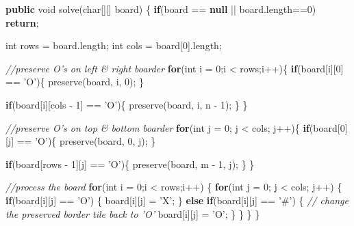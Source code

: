 \documentclass[]{book}
\newenvironment{Shaded}{\begin{snugshade}}{\end{snugshade}}
\newcommand{\CharTok}[1]{\textcolor[rgb]{0.31,0.60,0.02}{#1}}
\newcommand{\CommentTok}[1]{\textcolor[rgb]{0.56,0.35,0.01}{\textit{#1}}}
\newcommand{\DataTypeTok}[1]{\textcolor[rgb]{0.13,0.29,0.53}{#1}}
\newcommand{\DecValTok}[1]{\textcolor[rgb]{0.00,0.00,0.81}{#1}}
\newcommand{\FunctionTok}[1]{\textcolor[rgb]{0.00,0.00,0.00}{#1}}
\newcommand{\KeywordTok}[1]{\textcolor[rgb]{0.13,0.29,0.53}{\textbf{#1}}}
\newcommand{\NormalTok}[1]{#1}
\begin{document}
\begin{Shaded}
\begin{Highlighting}[]
\KeywordTok{public} \DataTypeTok{void} \FunctionTok{solve}\NormalTok{(}\DataTypeTok{char}\NormalTok{[][] board) \{}
    \KeywordTok{if}\NormalTok{(board == }\KeywordTok{null}\NormalTok{ || board.}\FunctionTok{length}\NormalTok{==}\DecValTok{0}\NormalTok{)}
        \KeywordTok{return}\NormalTok{;}

    \DataTypeTok{int}\NormalTok{ rows = board.}\FunctionTok{length}\NormalTok{;}
    \DataTypeTok{int}\NormalTok{ cols = board[}\DecValTok{0}\NormalTok{].}\FunctionTok{length}\NormalTok{;}

    \CommentTok{//preserve O's on left & right boarder}
    \KeywordTok{for}\NormalTok{(}\DataTypeTok{int}\NormalTok{ i = }\DecValTok{0}\NormalTok{;i < rows;i++)\{}
        \KeywordTok{if}\NormalTok{(board[i][}\DecValTok{0}\NormalTok{] == }\CharTok{'O'}\NormalTok{)\{}
            \FunctionTok{preserve}\NormalTok{(board, i, }\DecValTok{0}\NormalTok{);}
\NormalTok{        \}}

        \KeywordTok{if}\NormalTok{(board[i][cols - }\DecValTok{1}\NormalTok{] == }\CharTok{'O'}\NormalTok{)\{}
            \FunctionTok{preserve}\NormalTok{(board, i, n - }\DecValTok{1}\NormalTok{);}
\NormalTok{        \}}
\NormalTok{    \}}

    \CommentTok{//preserve O's on top & bottom boarder}
    \KeywordTok{for}\NormalTok{(}\DataTypeTok{int}\NormalTok{ j = }\DecValTok{0}\NormalTok{; j < cols; j++)\{}
        \KeywordTok{if}\NormalTok{(board[}\DecValTok{0}\NormalTok{][j] == }\CharTok{'O'}\NormalTok{)\{}
            \FunctionTok{preserve}\NormalTok{(board, }\DecValTok{0}\NormalTok{, j);}
\NormalTok{        \}}

        \KeywordTok{if}\NormalTok{(board[rows - }\DecValTok{1}\NormalTok{][j] == }\CharTok{'O'}\NormalTok{)\{}
            \FunctionTok{preserve}\NormalTok{(board, m - }\DecValTok{1}\NormalTok{, j);}
\NormalTok{        \}}
\NormalTok{    \}}

    \CommentTok{//process the board}
    \KeywordTok{for}\NormalTok{(}\DataTypeTok{int}\NormalTok{ i = }\DecValTok{0}\NormalTok{;i < rows;i++) \{}
        \KeywordTok{for}\NormalTok{(}\DataTypeTok{int}\NormalTok{ j = }\DecValTok{0}\NormalTok{; j < cols; j++) \{}
            \KeywordTok{if}\NormalTok{(board[i][j] == }\CharTok{'O'}\NormalTok{) \{}
\NormalTok{                board[i][j] = }\CharTok{'X'}\NormalTok{;}
\NormalTok{            \} }\KeywordTok{else} \KeywordTok{if}\NormalTok{(board[i][j] == }\CharTok{'#'}\NormalTok{) \{}
                \CommentTok{// change the preserved border tile back to 'O'}
\NormalTok{                board[i][j] = }\CharTok{'O'}\NormalTok{;}
\NormalTok{            \}}
\NormalTok{        \}}
\NormalTok{    \}}
\NormalTok{\}}


\end{Highlighting}
\end{Shaded}
\end{document}
